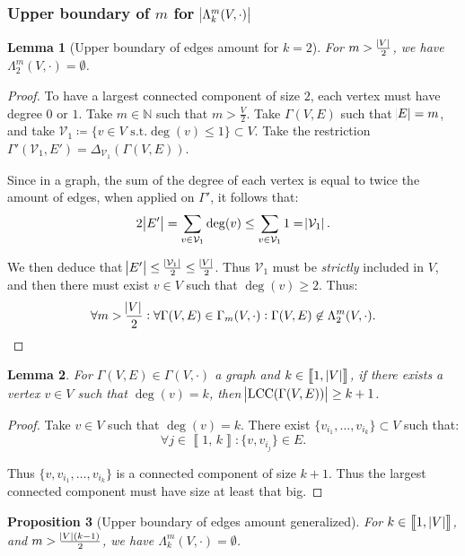 \documentclass{article}
\newtheorem{lemma}{Lemma}[section]
\newtheorem{proposition}[lemma]{Proposition}
\theoremstyle{definition}
\theoremstyle{remark}
\DeclareMathOperator{\LCC}{LCC}
\newcommand{\N}{\mathbb N}
\newcommand{\intint}[2]{\left\llbracket#1, \, #2\right\rrbracket}
\newcommand{\st}{\text{ s.t.}}
\begin{document}
		\subsubsection{Upper boundary of $m$ for $\abs {\Lambda_k^m(V, \cdot)}$}
			\begin{lemma}[Upper boundary of edges amount for $k=2$]\label{lemma:upper boundary k=2} For $m > \frac {\abs V}2$, we have $\Lambda_2^m(V, \cdot) = \emptyset$.
			\end{lemma}

			\begin{proof} To have a largest connected component of size $2$, each vertex must have degree $0$ or $1$. Take $m \in \N$ such that $m > \frac V2$. Take
			$\Gamma(V, E)$ such that $\abs E = m$, and take $\mathcal V_1 \coloneqq \{v \in V \st \deg(v) \leq 1\} \subset V$. Take the restriction
			$\Gamma'(\mathcal V_1, E') = \Delta_{\mathcal V_1}(\Gamma(V, E))$.

			Since in a graph, the sum of the degree of each vertex is equal to twice the amount of edges, when applied on $\Gamma'$, it follows that:
			\[2\abs {E'} = \sum_{v \in \mathcal V_1}\deg(v) \leq \sum_{v \in \mathcal V_1}1 = \abs {\mathcal V_1}.\]

			We then deduce that $\abs {E'} \leq \frac {\abs {\mathcal V_1}}2 \leq \frac {\abs V}2$. Thus $\mathcal V_1$ must be \textit{strictly} included in $V$,
			and then there must exist $v \in V$ such that $\deg(v) \geq 2$. Thus:
			\[\forall m > \frac {\abs V}2 : \forall \Gamma(V, E) \in \Gamma_m(V, \cdot) : \Gamma(V, E) \not \in \Lambda_2^m(V, \cdot).\]
			\end{proof}

			\begin{lemma} For $\Gamma(V, E) \in \Gamma(V, \cdot)$ a graph and $k \in \intint 1{\abs V}$, if there exists a vertex $v \in V$ such that $\deg(v) = k$,
			then $\abs {\LCC(\Gamma(V, E))} \geq k+1$.
			\end{lemma}

			\begin{proof} Take $v \in V$ such that $\deg(v) = k$. There exist $\{v_{i_1}, \ldots, v_{i_k}\} \subset V$ such that:
			\[\forall j \in \intint 1k : \{v, v_{i_j}\} \in E.\]

			Thus $\{v, v_{i_1}, \ldots, v_{i_k}\}$ is a connected component of size $k+1$. Thus the largest connected component must have size at least that big.
			\end{proof}

			\begin{proposition}[Upper boundary of edges amount generalized] For $k \in \intint 1{\abs V}$, and $m > \frac {\abs V(k-1)}2$, we have $\Lambda_k^m(V, \cdot) = \emptyset$.
			\end{proposition}
\end{document}

